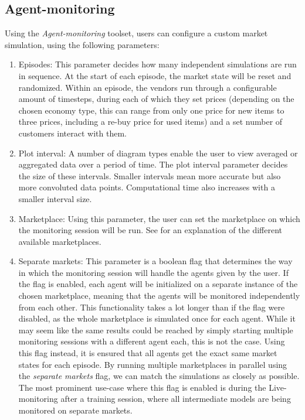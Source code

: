 \subsection*{Agent-monitoring}\label{subsec:AgentMonitoring}

Using the \emph{Agent-monitoring} toolset, users can configure a custom market simulation, using the following parameters:

\begin{enumerate}
	\item Episodes: This parameter decides how many independent simulations are run in sequence. At the start of each episode, the market state will be reset and randomized. Within an episode, the vendors run through a configurable amount of timesteps, during each of which they set prices (depending on the chosen economy type, this can range from only one price for new items to three prices, including a re-buy price for used items) and a set number of customers interact with them.
	\item Plot interval: A number of diagram types enable the user to view averaged or aggregated data over a period of time. The plot interval parameter decides the size of these intervals. Smaller intervals mean more accurate but also more convoluted data points. Computational time also increases with a smaller interval size.
	\item Marketplace: Using this parameter, the user can set the marketplace on which the monitoring session will be run. See  for an explanation of the different available marketplaces.
	\item Separate markets: This parameter is a boolean flag that determines the way in which the monitoring session will handle the agents given by the user. If the flag is enabled, each agent will be initialized on a separate instance of the chosen marketplace, meaning that the agents will be monitored independently from each other. This functionality takes a lot longer than if the flag were disabled, as the whole marketplace is simulated once for each agent. While it may seem like the same results could be reached by simply starting multiple monitoring sessions with a different agent each, this is not the case. Using this flag instead, it is ensured that all agents get the exact same market states for each episode. By running multiple marketplaces in parallel using the \emph{separate markets} flag, we can match the simulations as closely as possible. The most prominent use-case where this flag is enabled is during the Live-monitoring after a training session, where all intermediate models are being monitored on separate markets.


\end{enumerate}
